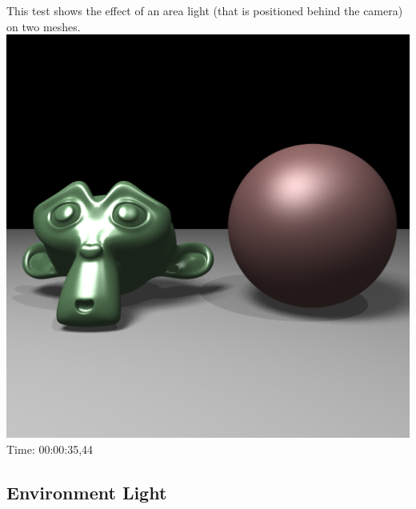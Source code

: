 \documentclass[12pt]{article} %
\begin{document}
This test shows the effect of an area light (that is positioned behind the camera) on two meshes.\\
\includegraphics[width=\linewidth]{Homework4/tests/02_area.png}
Time: 00:00:35,44


\subsection{Environment Light} 
\end{document}
